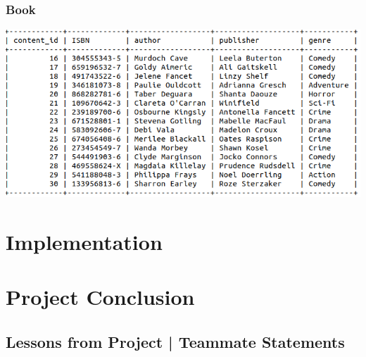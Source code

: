 \documentclass[letter, 12pt, titlepage]{article}
\begin{document}
		\subsubsection{Book}
			\includegraphics[scale=.5]{book.png}

\section{Implementation}


\section{Project Conclusion}
	
	\subsection{Lessons from Project | Teammate Statements}
\end{document}
